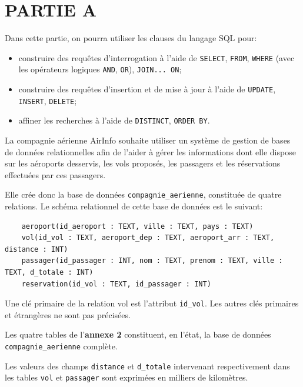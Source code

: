 

\medskip


\section*{PARTIE A}

Dans cette partie, on pourra utiliser les clauses du langage SQL pour:

\begin{itemize}
    \item construire des requêtes d'interrogation à l'aide de \texttt{SELECT}, \texttt{FROM}, \texttt{WHERE} (avec les opérateurs logiques \texttt{AND}, \texttt{OR}), \texttt{JOIN... ON};
    \item construire des requêtes d'insertion et de mise à jour à l'aide de \texttt{UPDATE}, \texttt{INSERT}, \texttt{DELETE};
    \item affiner les recherches à l'aide de \texttt{DISTINCT}, \texttt{ORDER BY}.
\end{itemize}

La compagnie aérienne AirInfo souhaite utiliser un système de gestion de bases de données relationnelles afin de l'aider à gérer les informations dont elle dispose sur les aéroports desservis, les vols proposés, les passagers et les réservations effectuées par ces passagers.

Elle crée donc la base de données \texttt{compagnie\_aerienne}, constituée de quatre relations. Le schéma relationnel de cette base de données est le suivant:

\begin{verbatim}
    aeroport(id_aeroport : TEXT, ville : TEXT, pays : TEXT)
    vol(id_vol : TEXT, aeroport_dep : TEXT, aeroport_arr : TEXT, distance : INT)
    passager(id_passager : INT, nom : TEXT, prenom : TEXT, ville : TEXT, d_totale : INT)
    reservation(id_vol : TEXT, id_passager : INT)
\end{verbatim}

Une clé primaire de la relation vol est l'attribut \texttt{id\_vol}. Les autres clés primaires et étrangères ne sont pas précisées.

Les quatre tables de l'\textbf{annexe 2} constituent, en l'état, la base de données \texttt{compagnie\_aerienne} complète.

Les valeurs des champs \texttt{distance} et \texttt{d\_totale} intervenant respectivement dans les tables \texttt{vol} et \texttt{passager} sont exprimées en milliers de kilomètres.

